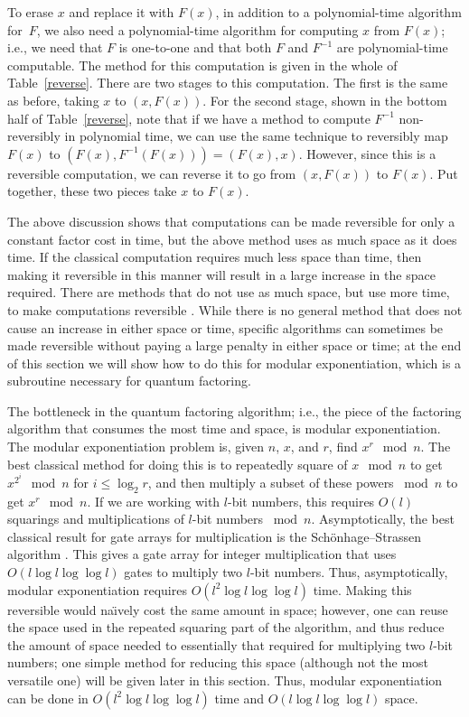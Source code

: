 To erase $x$ and replace it with $F(x)$, in addition to a
polynomial-time algorithm for~$F$, we also need
a polynomial-time algorithm for computing $x$ 
from $F(x)$; i.e., we need that $F$ is one-to-one and
that both $F$ and $F^{-1}$ are polynomial-time computable.  
The method for this computation
is given in the whole of Table~\ref{reverse}.
There are two stages to this computation.  The first is the same as
before, taking $x$ to $(x,F(x))$.  For the second stage, shown in the
bottom half of Table~\ref{reverse}, note that if
we have a method to compute $F^{-1}$ non-reversibly in polynomial time, 
we can use the same technique to reversibly
map $F(x)$ to $(F(x), F^{-1}(F(x))) = (F(x),x)$.  However, since this
is a reversible computation, we can reverse it
to go from $(x,F(x))$ to $F(x)$.  Put together,
these two pieces take $x$ to $F(x)$.


The above discussion shows that computations can be made reversible for
only a constant factor cost in time, but the above method uses as much space
as it does time.  If the classical computation requires much less space 
than time, then making it reversible in this manner will result
in a large increase 
in the space required.  There are methods that do not use as much
space, but use more time, to 
make computations reversible \cite{Benn89,LeSh}.  While there is no 
general method that does not cause an increase in either space or time, 
specific algorithms can sometimes be made reversible without paying 
a large penalty in either space or time; at the end of this
section we will show how to do 
this for modular exponentiation, which is a subroutine necessary for 
quantum factoring.

The bottleneck in the quantum factoring algorithm; i.e., the piece
of the factoring algorithm that consumes the most time and
space, is modular exponentiation.  The modular exponentiation 
problem is, given $n$, $x$, and $r$, find $x^r \mod{n}$.  
The best classical method for doing this is to repeatedly square of 
$x\mod{n}$ to get $x^{2^i}\mod{n}$ for $i\leq\log_2 r$, and then multiply a 
subset of these powers $\bmod{n}$ to get $x^r\mod{n}$.  If
we are working with $l$-bit numbers, this requires $O(l)$ squarings
and multiplications of $l$-bit numbers $\bmod{n}$.  Asymptotically, 
the best classical result for gate arrays for 
multiplication is the Sch\"onhage--Strassen algorithm \cite{ScSt,Knut,Scho}.
This gives a gate array for integer multiplication that uses
$O(l \log l \log \log l)$ gates to multiply two $l$-bit numbers.  Thus,
asymptotically, modular exponentiation requires $O(l^2 \log l \log \log l)$
time.  Making this reversible would na\"\i vely cost the same amount in 
space; however, one can reuse the space used in the repeated squaring part 
of the algorithm, and thus reduce the amount of space needed to essentially
that required for multiplying two $l$-bit numbers; one simple
method for reducing this space (although 
not the most versatile one) will be given later in this 
section.  Thus, modular exponentiation can be done in 
$O(l^2 \log l \log \log l)$ time and $O(l \log l \log \log l )$ space.  

